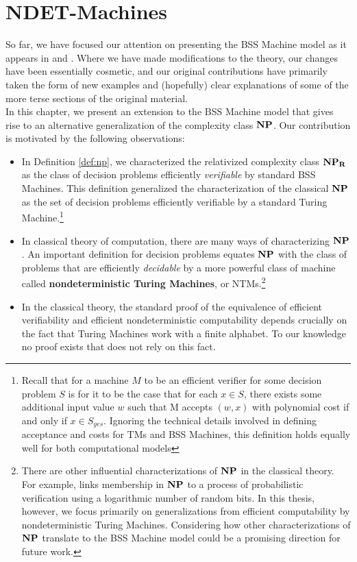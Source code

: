  \chapter{NDET-Machines}
\label{chap:ndet}

So far, we have focused our attention on presenting the BSS Machine
model as it appears in \cite{B98} and \cite{B89}.  Where we have made
modifications to the theory, our changes have been essentially
cosmetic, and our original contributions have primarily taken the form
of new examples and (hopefully) clear explanations of
some of the more terse sections of the original material.\\

In this chapter, we present an extension to the BSS Machine model that
gives rise to an alternative generalization of the complexity class
$\mathbf{NP}$.  Our contribution is motivated by the following observations:

\begin{itemize}

\item In Definition \ref{def:np}, we characterized the relativized
  complexity class $\mathbf{NP_R}$ as the class of decision problems efficiently
  \emph{verifiable} by standard BSS Machines.  This definition
  generalized the characterization of the classical $\mathbf{NP}$ as the set
  of decision problems efficiently verifiable by a standard Turing
  Machine.\footnote{Recall that for a machine $M$ to be an efficient
    verifier for some decision problem $S$ is for it to be the case
    that for each $x \in S$, there exists some additional input value
    $w$ such that M accepts $(w, x)$ with polynomial cost if and only
    if $x \in S_{yes}$.  Ignoring the technical details involved in
    defining acceptance and costs for TMs and BSS Machines, this
    definition holds equally well for both computational models}
  
\item In classical theory of computation, there are many ways of
  characterizing $\mathbf{NP}$.  An important definition for decision
  problems equates $\mathbf{NP}$ with the class of problems that are
  efficiently \emph{decidable} by a more powerful class of machine
  called \textbf{nondeterministic Turing Machines}, or
  NTMs.\footnote{There are other influential characterizations of
    $\mathbf{NP}$ in the classical theory.  For example, \cite{AS98} links
    membership in $\mathbf{NP}$ to a process of probabilistic verification
    using a logarithmic number of random bits.  In this thesis,
    however, we focus primarily on generalizations from efficient
    computability by nondeterministic Turing Machines.  Considering
    how other characterizations of $\mathbf{NP}$ translate to the BSS
    Machine model could be a promising direction for future work.}

\item In the classical theory, the standard proof of the equivalence
  of efficient verifiability and efficient nondeterministic
  computability depends crucially on the fact that Turing Machines
  work with a finite alphabet.  To our knowledge no proof exists that
  does not rely on this fact.
\end{itemize}

